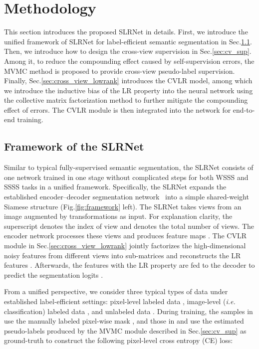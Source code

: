 \documentclass[twocolumn]{svjour3}          \smartqed  \usepackage{graphicx}
\makeatletter
\newcommand{\Fig}{Fig.\@\xspace}
\newcommand{\Sec}{Sec.\@\xspace}
\makeatother
\begin{document}
\section{Methodology}
\label{sec:approach}

This section introduces the proposed SLRNet in details. First, we introduce the unified framework of SLRNet for label-efficient semantic segmentation in \Sec\ref{sec:framework}. Then, we introduce how to design the cross-view supervision in \Sec\ref{sec:cv_sup}. Among it, to reduce the compounding effect caused by self-supervision errors, the MVMC method is proposed to provide cross-view pseudo-label supervision.
Finally, \Sec\ref{sec:cross_view_lowrank} introduces the CVLR model, among which we introduce the inductive bias of the LR property into the neural network using the collective matrix factorization method to further mitigate the compounding effect of errors. 
The CVLR module is then integrated into the network for end-to-end training.

\subsection{Framework of the SLRNet}
\label{sec:framework}
Similar to typical fully-supervised semantic segmentation, the SLRNet consists of one network trained in one stage without complicated steps for both WSSS and SSSS tasks in a unified framework.
Specifically, the SLRNet expands the established encoder--decoder segmentation network~\citep{deeplabv3plus2018} into a simple shared-weight Siamese structure (\Fig\ref{fig:framework} left).
The SLRNet takes  views  from an image  augmented by transformations  as input.
For explanation clarity, the superscript  denotes the index of view  and  denotes the total number of views.
The encoder network processes these views and produces feature maps .
The CVLR module  in \Sec\ref{sec:cross_view_lowrank} jointly factorizes the high-dimensional noisy features  from different views into sub-matrices and reconstructs the LR features .
Afterwards, the features with the LR property are fed to the decoder to predict the segmentation logits .

From a unified perspective, we consider three typical types of data under established label-efficient settings: pixel-level labeled data , image-level (\textit{i.e.} classification) labeled data , and unlabeled data .
During training, the samples in  use the manually labeled pixel-wise mask , and those in  and  use the estimated pseudo-labels  produced by the MVMC module described in \Sec\ref{sec:cv_sup} as ground-truth to construct the following pixel-level cross entropy (CE) loss:
\end{document}
